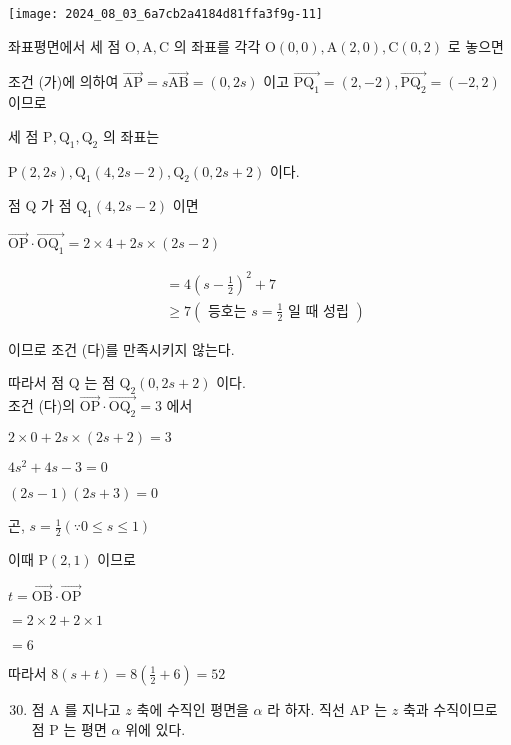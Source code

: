 \documentclass[10pt]{article}
\begin{document}
\begin{center}
\texttt{[image: 2024\_08\_03\_6a7cb2a4184d81ffa3f9g-11]}
\end{center}

좌표평면에서 세 점 \(\mathrm{O}, \mathrm{A}, \mathrm{C}\) 의 좌표를 각각 \(\mathrm{O}(0,0), \mathrm{A}(2,0), \mathrm{C}(0,2)\) 로 놓으면

조건 (가)에 의하여 \(\overrightarrow{\mathrm{AP}}=s \overrightarrow{\mathrm{AB}}=(0,2 s)\) 이고 \(\overrightarrow{\mathrm{PQ}_{1}}=(2,-2), \overrightarrow{\mathrm{PQ}_{2}}=(-2,2)\) 이므로

세 점 \(\mathrm{P}, \mathrm{Q}_{1}, \mathrm{Q}_{2}\) 의 좌표는

\(\mathrm{P}(2,2 s), \mathrm{Q}_{1}(4,2 s-2), \mathrm{Q}_{2}(0,2 s+2)\) 이다.

점 Q 가 점 \(\mathrm{Q}_{1}(4,2 s-2)\) 이면

\(\overrightarrow{\mathrm{OP}} \cdot \overrightarrow{\mathrm{OQ}_{1}}=2 \times 4+2 s \times(2 s-2)\)

\[
\begin{aligned}
& =4\left(s-\frac{1}{2}\right)^{2}+7 \\
& \geq 7\left(\text { 등호는 } s=\frac{1}{2} \text { 일 때 성립 }\right)
\end{aligned}
\]

이므로 조건 (다)를 만족시키지 않는다.

따라서 점 Q 는 점 \(\mathrm{Q}_{2}(0,2 s+2)\) 이다.\\
조건 (다)의 \(\overrightarrow{\mathrm{OP}} \cdot \overrightarrow{\mathrm{OQ}_{2}}=3\) 에서

\(2 \times 0+2 s \times(2 s+2)=3\)

\(4 s^{2}+4 s-3=0\)

\((2 s-1)(2 s+3)=0\)

곤, \(s=\frac{1}{2}(\because 0 \leq s \leq 1)\)

이때 \(\mathrm{P}(2,1)\) 이므로

\(t=\overrightarrow{\mathrm{OB}} \cdot \overrightarrow{\mathrm{OP}}\)

\(=2 \times 2+2 \times 1\)

\(=6\)

따라서 \(8(s+t)=8\left(\frac{1}{2}+6\right)=52\)

\begin{enumerate}
  \setcounter{enumi}{29}
  \item 점 A 를 지나고 \(z\) 축에 수직인 평면을 \(\alpha\) 라 하자. 직선 AP 는 \(z\) 축과 수직이므로 점 P 는 평면 \(\alpha\) 위에 있다.
\end{enumerate}
\end{document}
